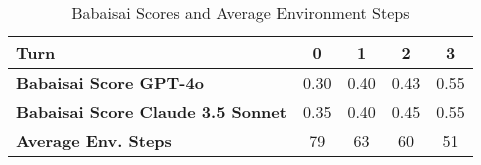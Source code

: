 \renewcommand{\arraystretch}{1.5} 
\begin{table}[h!]

\centering
\begin{tabular}{|>{\raggedright\arraybackslash}p{6cm}|c|c|c|c|}
\hline
\textbf{Turn} & \textbf{0} & \textbf{1} & \textbf{2} & \textbf{3} \\
\hline
\textbf{Babaisai Score GPT-4o} & 0.30 & 0.40 & 0.43 & 0.55 \\
\hline
\textbf{Babaisai Score Claude 3.5 Sonnet} & 0.35 & 0.40 & 0.45 & 0.55 \\
\hline
\textbf{Average Env. Steps} & 79 & 63 & 60 & 51 \\
\hline
\end{tabular}
\caption{Babaisai Scores and Average Environment Steps}
\end{table}